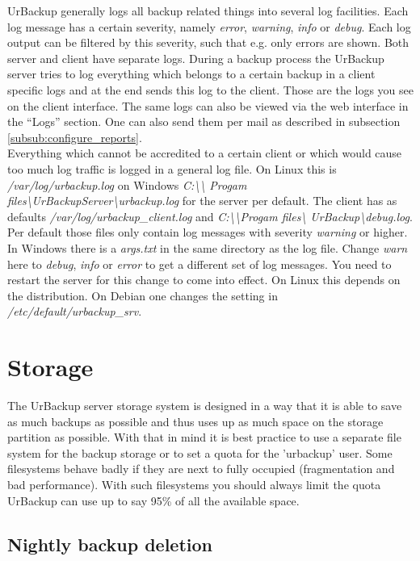\documentclass[a4paper,10pt]{article} \usepackage[breaklinks=true]{hyperref}
\begin{document}
UrBackup generally logs all backup related things into several log facilities.
Each log message has a certain severity, namely \textsl{error},
\textsl{warning}, \textsl{info} or \textsl{debug}.
Each log output can be filtered by this severity, such that e.g. only errors are
shown. Both server and client have separate logs. During a backup process the
UrBackup server tries to log everything which belongs to a certain backup in a
client specific logs and at the end sends this log to the client. Those are the
logs you see on the client interface. The same logs can also be viewed via the
web interface in the ``Logs'' section. One can also send them per mail as
described in subsection \ref{subsub:configure_reports}.\\
Everything which cannot be accredited to a certain client or which would cause
too much log traffic is logged in a general log file. On Linux this is
\textsl{/var/log/urbackup.log} on Windows \textsl{C:\textbackslash\textbackslash
Progam files\textbackslash UrBackupServer\textbackslash urbackup.log} for the
server per default.  The client has as defaults
\textsl{/var/log/urbackup\_client.log} and
\textsl{C:\textbackslash\textbackslash Progam files\textbackslash
UrBackup\textbackslash debug.log}. Per default those files only contain log
messages with severity \textsl{warning} or higher. In Windows there is a
\textsl{args.txt} in the same directory as the log file. Change \textsl{warn}
here to \textsl{debug}, \textsl{info} or \textsl{error} to get a different set
of log messages. You need to restart the server for this change to come into
effect. On Linux this depends on the distribution. On Debian one changes the
setting in \textsl{/etc/default/urbackup\_srv}.

\section{Storage}

The UrBackup server storage system is designed in a way that it is able to save
as much backups as possible and thus uses up as much space on the storage
partition as possible. With that in mind it is best practice to use a separate
file system for the backup storage or to set a quota for the 'urbackup' user.
Some filesystems behave badly if they are next to fully occupied (fragmentation
and bad performance). With such filesystems you should always limit the quota
UrBackup can use up to say 95\% of all the available space.

\subsection{Nightly backup deletion}
\end{document}
